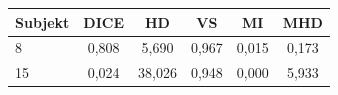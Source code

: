 \begin{tabular}{l c c c c c}
 \hline
Subjekt & DICE & HD & VS & MI & MHD \\ \hline
8 & 0,808 & 5,690 & 0,967 & 0,015 & 0,173 \\
15 & 0,024 & 38,026 & 0,948 & 0,000 & 5,933 \\
\hline 
 \end{tabular}
